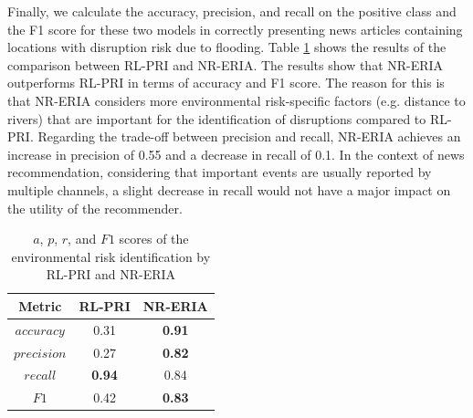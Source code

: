 \documentclass[
]{ceurart}
\begin{document}
Finally, we calculate the accuracy, precision, and recall on the positive class and the F1 score for these two models \cite{ting2017encyclopedia} in correctly presenting news articles containing locations with disruption risk due to flooding. Table \ref{tab:RL-ERIA e5} shows the results of the comparison between RL-PRI and NR-ERIA. The results show that NR-ERIA outperforms RL-PRI in terms of accuracy and F1 score. The reason for this is that NR-ERIA considers more environmental risk-specific factors (e.g. distance to rivers) that are important for the identification of disruptions compared to RL-PRI. 
Regarding the trade-off between precision and recall, NR-ERIA achieves an increase in precision of 0.55 and a decrease in recall of 0.1. In the context of news recommendation, considering that important events are usually reported by multiple channels, a slight decrease in recall would not have a major impact on the utility of the recommender.

\begin{table}[h]
\caption{$a$, $p$, $r$, and $F1$ scores of the environmental risk identification by RL-PRI and NR-ERIA}
\label{tab:RL-ERIA e5}
  \centering
  \begin{tabular}{ccc}
    \toprule
    \textbf{Metric} &\textbf{ RL-PRI} & \textbf{NR-ERIA} \\
    \midrule
  $accuracy$ & 0.31 & \textbf{0.91}\\
 $precision$ & 0.27 & \textbf{0.82}\\
 $recall$ & \textbf{0.94} & 0.84\\
 $F1$ & 0.42 & \textbf{0.83}\\
    \bottomrule
  \end{tabular}
\end{table}
\end{document}
